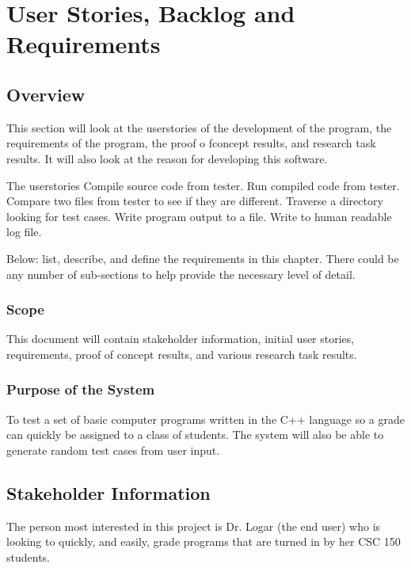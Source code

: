 \chapter{User Stories, Backlog and Requirements}
\section{Overview}


This section will look at the userstories of the development of the program, the requirements
of the program, the proof o fconcept results, and research task results. It will also look at the
reason for developing this software. 

 The userstories 
Compile source code from tester.   Run compiled code from tester.   Compare two files from tester to see
if they are different.   Traverse a directory looking for test cases.   Write program output to a file.   Write
to human readable log file.   

Below:   list, describe, and define the requirements in this chapter.  
There could be any number of sub-sections to help provide the necessary level of 
detail. 





\subsection{Scope}


This document will contain stakeholder information, 
initial user stories, requirements, proof of concept results, and various research 
task results. 



\subsection{Purpose of the System}
To test a set of basic computer programs written in the C++ language so a grade can quickly be assigned to a class of students.
The system will also be able to generate random test cases from user input.


\section{ Stakeholder Information}


The person most interested in this project is Dr. Logar (the end user) who is looking to quickly, 
and easily, grade programs that are turned in by her CSC 150 students.


